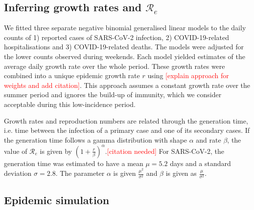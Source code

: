 \documentclass[10pt, a4paper, twoside]{article}
\begin{document}
\begin{multicols}{2}
\subsection{Inferring growth rates and $\mathcal{R}_e$}

We fitted three separate negative binomial generalised linear models to the daily counts of 1) reported cases of SARS-CoV-2 infection, 2) COVID-19-related hospitalisations and 3) COVID-19-related deaths.
The models were adjusted for the lower counts observed during weekends.
Each model yielded estimates of the average daily growth rate over the whole period.
These growth rates were combined into a unique epidemic growth rate $r$ using \textcolor{red}{[explain approach for weights and add citation]}.
This approach assumes a constant growth rate over the summer period and ignores the build-up of immunity, which we consider acceptable during this low-incidence period.

Growth rates and reproduction numbers are related through the generation time, i.e. time between the infection of a primary case and one of its secondary cases.\cite{svensson2007note}
If the generation time follows a gamma distribution with shape $\alpha$ and rate $\beta$, the value of $\mathcal{R}_e$ is given by $(1 + \frac{r}{\beta} )^\alpha$.\textcolor{red}{[citation needed]}
For SARS-CoV-2, the generation time was estimated to have a mean $\mu= 5.2$ days and a standard deviation $\sigma = 2.8$.\cite{ganyani_estimating_2020}
The parameter $\alpha$ is given $\frac{\mu^2}{\sigma^2 }$ and $\beta$ is given as $\frac{\mu}{\sigma^2}$. 

\subsection{Epidemic simulation}


\end{multicols}
\end{document}
